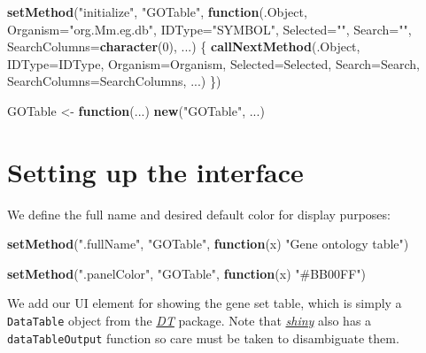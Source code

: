 \documentclass[
]{book}
\newenvironment{Shaded}{\begin{snugshade}}{\end{snugshade}}
\newcommand{\ControlFlowTok}[1]{\textcolor[rgb]{0.13,0.29,0.53}{\textbf{#1}}}
\newcommand{\DataTypeTok}[1]{\textcolor[rgb]{0.13,0.29,0.53}{#1}}
\newcommand{\DecValTok}[1]{\textcolor[rgb]{0.00,0.00,0.81}{#1}}
\newcommand{\KeywordTok}[1]{\textcolor[rgb]{0.13,0.29,0.53}{\textbf{#1}}}
\newcommand{\NormalTok}[1]{#1}
\newcommand{\StringTok}[1]{\textcolor[rgb]{0.31,0.60,0.02}{#1}}
\begin{document}
\begin{Shaded}
\begin{Highlighting}[]
\KeywordTok{setMethod}\NormalTok{(}\StringTok{"initialize"}\NormalTok{, }\StringTok{"GOTable"}\NormalTok{, }\ControlFlowTok{function}\NormalTok{(.Object, }
    \DataTypeTok{Organism=}\StringTok{"org.Mm.eg.db"}\NormalTok{, }\DataTypeTok{IDType=}\StringTok{"SYMBOL"}\NormalTok{, }
    \DataTypeTok{Selected=}\StringTok{""}\NormalTok{, }\DataTypeTok{Search=}\StringTok{""}\NormalTok{, }\DataTypeTok{SearchColumns=}\KeywordTok{character}\NormalTok{(}\DecValTok{0}\NormalTok{), ...)}
\NormalTok{\{}
    \KeywordTok{callNextMethod}\NormalTok{(.Object, }\DataTypeTok{IDType=}\NormalTok{IDType, }\DataTypeTok{Organism=}\NormalTok{Organism, }
        \DataTypeTok{Selected=}\NormalTok{Selected, }\DataTypeTok{Search=}\NormalTok{Search, }
        \DataTypeTok{SearchColumns=}\NormalTok{SearchColumns, ...)}
\NormalTok{\})}

\NormalTok{GOTable <-}\StringTok{ }\ControlFlowTok{function}\NormalTok{(...) }\KeywordTok{new}\NormalTok{(}\StringTok{"GOTable"}\NormalTok{, ...)}
\end{Highlighting}
\end{Shaded}

\hypertarget{setting-up-the-interface}{%
\section{Setting up the interface}\label{setting-up-the-interface}}

We define the full name and desired default color for display purposes:

\begin{Shaded}
\begin{Highlighting}[]
\KeywordTok{setMethod}\NormalTok{(}\StringTok{".fullName"}\NormalTok{, }\StringTok{"GOTable"}\NormalTok{, }\ControlFlowTok{function}\NormalTok{(x) }\StringTok{"Gene ontology table"}\NormalTok{)}

\KeywordTok{setMethod}\NormalTok{(}\StringTok{".panelColor"}\NormalTok{, }\StringTok{"GOTable"}\NormalTok{, }\ControlFlowTok{function}\NormalTok{(x) }\StringTok{"#BB00FF"}\NormalTok{)}
\end{Highlighting}
\end{Shaded}

We add our UI element for showing the gene set table, which is simply a \texttt{DataTable} object from the \emph{\href{https://CRAN.R-project.org/package=DT}{DT}} package.
Note that \emph{\href{https://CRAN.R-project.org/package=shiny}{shiny}} also has a \texttt{dataTableOutput} function so care must be taken to disambiguate them.
\end{document}
